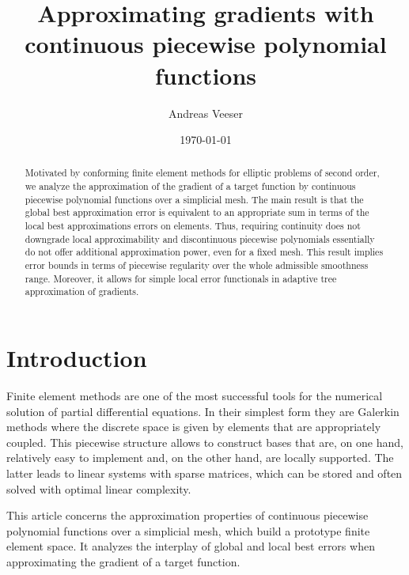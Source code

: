 \documentclass[a4paper]{amsart}
\numberwithin{equation}{section}
\theoremstyle{plain}
\theoremstyle{definition}
\begin{document}
\title[Piecewise polynomial approximation of gradients]{Approximating 
gradients with continuous piecewise polynomial functions}
\date{\today}

\author[A. Veeser]{Andreas Veeser}


\begin{abstract}
Motivated by conforming finite element methods for elliptic problems of second 
order, we analyze the approximation of the gradient of a target function by 
continuous piecewise polynomial functions over a simplicial mesh.  The main 
result is that the global best approximation error is equivalent to an 
appropriate sum in terms of the local best approximations errors on elements.  
Thus, requiring continuity does not downgrade local approximability and 
discontinuous piecewise polynomials essentially do not offer additional 
approximation power, even for a fixed mesh.  This result implies error bounds in 
terms of piecewise regularity over the whole admissible smoothness range.  
Moreover, it allows for simple local error functionals in adaptive tree 
approximation of gradients.
\end{abstract}

\maketitle

\section{Introduction}
\label{S:Intro}

Finite element methods are one of the most successful tools for the
numerical solution of partial differential equations.  In their
simplest form they are Galerkin methods where the discrete space is
given by elements that are appropriately coupled.  This piecewise
structure allows to construct bases that are, on one hand, relatively
easy to implement and, on the other hand, are locally supported.  The
latter leads to linear systems with sparse matrices, which can be
stored and often solved with optimal linear complexity.

 
\medskip This article concerns the approximation properties of continuous
piecewise polynomial functions over a simplicial mesh, which build a prototype 
finite element space.  It analyzes the interplay of global and local best 
errors when approximating the gradient of a target function.
\end{document}
